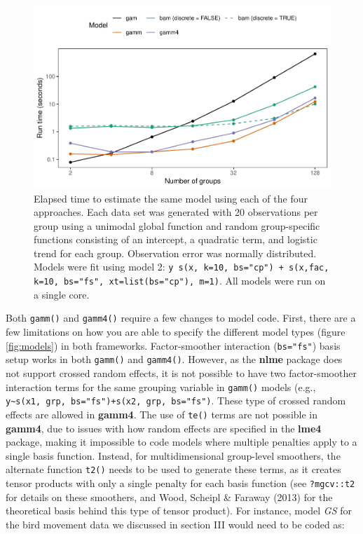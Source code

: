 \documentclass[12pt]{article}
\begin{document}
\begin{figure}
\centering
\includegraphics{../figures/alt_model_timing_plot-1.pdf}
\caption{\label{fig:alt_timing}Elapsed time to estimate the same model
using each of the four approaches. Each data set was generated with 20
observations per group using a unimodal global function and random
group-specific functions consisting of an intercept, a quadratic term,
and logistic trend for each group. Observation error was normally
distributed. Models were fit using model 2:
\texttt{y~s(x, k=10, bs="cp") + s(x,fac, k=10, bs="fs", xt=list(bs="cp"), m=1)}.
All models were run on a single core.}
\end{figure}

Both \texttt{gamm()} and \texttt{gamm4()} require a few changes to model
code. First, there are a few limitations on how you are able to specify
the different model types (figure \ref{fig:models}) in both frameworks.
Factor-smoother interaction (\texttt{bs="fs"}) basis setup works in both
\texttt{gamm()} and \texttt{gamm4()}. However, as the \textbf{nlme}
package does not support crossed random effects, it is not possible to
have two factor-smoother interaction terms for the same grouping
variable in \texttt{gamm()} models (e.g.,
\texttt{y\textasciitilde{}s(x1,\ grp,\ bs="fs")+s(x2,\ grp,\ bs="fs")}.
These type of crossed random effects are allowed in \textbf{gamm4}. The
use of \texttt{te()} terms are not possible in \textbf{gamm4}, due to
issues with how random effects are specified in the \textbf{lme4}
package, making it impossible to code models where multiple penalties
apply to a single basis function. Instead, for multidimensional
group-level smoothers, the alternate function \texttt{t2()} needs to be
used to generate these terms, as it creates tensor products with only a
single penalty for each basis function (see \texttt{?mgcv::t2} for
details on these smoothers, and Wood, Scheipl \& Faraway (2013) for the
theoretical basis behind this type of tensor product). For instance,
model \emph{GS} for the bird movement data we discussed in section III
would need to be coded as:
\end{document}
